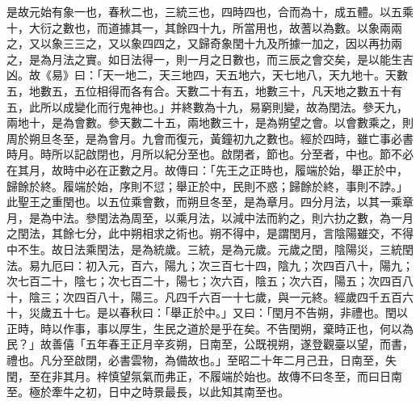 \begin{pinyinscope}
是故元始有象一也，春秋二也，三統三也，四時四也，合而為十，成五體。以五乘十，大衍之數也，而道據其一，其餘四十九，所當用也，故蓍以為數。以象兩兩之，又以象三三之，又以象四四之，又歸奇象閏十九及所據一加之，因以再扐兩之，是為月法之實。如日法得一，則一月之日數也，而三辰之會交矣，是以能生吉凶。故《易》曰：「天一地二，天三地四，天五地六，天七地八，天九地十。天數五，地數五，五位相得而各有合。天數二十有五，地數三十，凡天地之數五十有五，此所以成變化而行鬼神也。」并終數為十九，易窮則變，故為閏法。參天九，兩地十，是為會數。參天數二十五，兩地數三十，是為朔望之會。以會數乘之，則周於朔旦冬至，是為會月。九會而復元，黃鐘初九之數也。經於四時，雖亡事必書時月。時所以記啟閉也，月所以紀分至也。啟閉者，節也。分至者，中也。節不必在其月，故時中必在正數之月。故傳曰：「先王之正時也，履端於始，舉正於中，歸餘於終。履端於始，序則不愆；舉正於中，民則不惑；歸餘於終，事則不誖。」此聖王之重閏也。以五位乘會數，而朔旦冬至，是為章月。四分月法，以其一乘章月，是為中法。參閏法為周至，以乘月法，以減中法而約之，則六扐之數，為一月之閏法，其餘七分，此中朔相求之術也。朔不得中，是謂閏月，言陰陽雖交，不得中不生。故日法乘閏法，是為統歲。三統，是為元歲。元歲之閏，陰陽災，三統閏法。易九厄曰：初入元，百六，陽九；次三百七十四，陰九；次四百八十，陽九；次七百二十，陰七；次七百二十，陽七；次六百，陰五；次六百，陽五；次四百八十，陰三；次四百八十，陽三。凡四千六百一十七歲，與一元終。經歲四千五百六十，災歲五十七。是以春秋曰：「舉正於中。」又曰：「閏月不告朔，非禮也。閏以正時，時以作事，事以厚生，生民之道於是乎在矣。不告閏朔，棄時正也，何以為民？」故善僖「五年春王正月辛亥朔，日南至，公既視朔，遂登觀臺以望，而書，禮也。凡分至啟閉，必書雲物，為備故也。」至昭二十年二月己丑，日南至，失閏，至在非其月。梓慎望氛氣而弗正，不履端於始也。故傳不曰冬至，而曰日南至。極於牽牛之初，日中之時景最長，以此知其南至也。


\end{pinyinscope}

